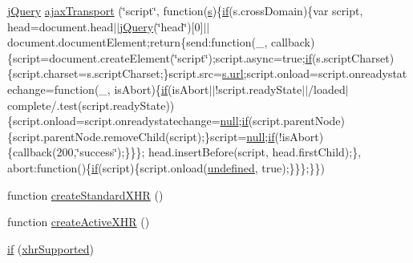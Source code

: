 \begin{DoxyCompactItemize}
\item 
\hyperlink{xe__solid__enterprise__login_2js_2login_8js_a5d40f04b6bb824963a42ec4b5fbfe262}{j\+Query} \hyperlink{jquery-1_8x_8js_ade7f5e1842214b9c2ed0c201344a110c}{ajax\+Transport} (\char`\"{}script\char`\"{}, function(\hyperlink{respond_8min_8js_ad9a7d92cb87932d25187fdec3ba1b621}{s})\{\hyperlink{menu_2tpl_2js_2jquery_8jstree_8js_acba95bef569cfaee32c4ed0212b2bb92}{if}(s.\+cross\+Domain)\{var script, head=document.\+head$\vert$$\vert$\hyperlink{xe__solid__enterprise__login_2js_2login_8js_a5d40f04b6bb824963a42ec4b5fbfe262}{j\+Query}(\char`\"{}head\char`\"{})\mbox{[}0\mbox{]}$\vert$$\vert$document.\+document\+Element;return\{send\+:function(\+\_\+, callback)\{script=document.\+create\+Element(\char`\"{}script\char`\"{});script.\+async=true;\hyperlink{menu_2tpl_2js_2jquery_8jstree_8js_acba95bef569cfaee32c4ed0212b2bb92}{if}(s.\+script\+Charset)\{script.\+charset=s.\+script\+Charset;\}script.\+src=\hyperlink{swfupload_8js_a440a52a9004fdab0700100a6ddb49f67}{s.\+url};script.\+onload=script.\+onreadystatechange=function(\+\_\+, is\+Abort)\{\hyperlink{menu_2tpl_2js_2jquery_8jstree_8js_acba95bef569cfaee32c4ed0212b2bb92}{if}(is\+Abort$\vert$$\vert$!script.\+ready\+State$\vert$$\vert$/loaded$\vert$complete/.test(script.\+ready\+State))\{script.\+onload=script.\+onreadystatechange=\hyperlink{modernizr_8min_8js_a286f9ec831c5e676eeb493248eab9575}{null};\hyperlink{menu_2tpl_2js_2jquery_8jstree_8js_acba95bef569cfaee32c4ed0212b2bb92}{if}(script.\+parent\+Node)\{script.\+parent\+Node.\+remove\+Child(script);\}script=\hyperlink{modernizr_8min_8js_a286f9ec831c5e676eeb493248eab9575}{null};\hyperlink{menu_2tpl_2js_2jquery_8jstree_8js_acba95bef569cfaee32c4ed0212b2bb92}{if}(!is\+Abort)\{callback(200,\char`\"{}success\char`\"{});\}\}\};   head.\+insert\+Before(script, head.\+first\+Child);\}, abort\+:function()\{\hyperlink{menu_2tpl_2js_2jquery_8jstree_8js_acba95bef569cfaee32c4ed0212b2bb92}{if}(script)\{script.\+onload(\hyperlink{menu_2tpl_2js_2jquery_8tmpl_8js_a08113a236cc18d2a9d5ce27e638012be}{undefined}, true);\}\}\};\}\})
\item 
function \hyperlink{jquery-1_8x_8js_acea019a8b67e4d114deb75d1e0b3474a}{create\+Standard\+X\+HR} ()
\item 
function \hyperlink{jquery-1_8x_8js_a54bf63f1b5f905292db45a1d6a9dc300}{create\+Active\+X\+HR} ()
\item 
\hyperlink{jquery-1_8x_8js_ae2dd433d7bb020adf83db5351a0671e1}{if} (\hyperlink{jquery-1_8x_8js_afd7e72f2f357a5a8b17e46776a6283eb}{xhr\+Supported})
\item 

\end{DoxyCompactItemize}
